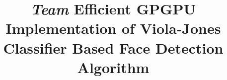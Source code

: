 \title{
\vspace{-0.15in}
\emph{\hspace{0.5in} Team \color{red}{Red Ninjas} \color{black}{-- Project Proposal for ECE759}}\newline
\newline
Efficient GPGPU Implementation of Viola-Jones Classifier Based Face Detection Algorithm
\vspace{-0.15in}
}

